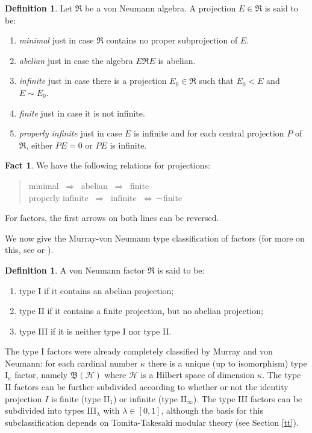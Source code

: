 \documentclass[11pt]{article}
\newcommand{\alg}[1]{\mathfrak{#1}}
\newcommand{\bh}{\mathfrak{B}(\mathcal{H})}
\theoremstyle{definition}
\newtheorem{fact}[thm]{Fact}
\theoremstyle{definition}
\newtheorem{defn}[thm]{Definition}
\theoremstyle{remark}
\def\2#1{{\mathcal #1}}
\def\al#1{{\mathfrak #1}}
\newcommand{\lra}{\:\Longrightarrow \:}
\begin{document}
\begin{defn} Let $\alg{R}$ be a von Neumann algebra.  A
  projection $E\in \alg{R}$ is said to be:
  \begin{enumerate}
  \item \emph{minimal} just in case $\alg{R}$ contains
    no proper subprojection of $E$.
  \item \emph{abelian} just in case the algebra $E\alg{R}E$ is abelian.
  \item \emph{infinite} just in case there is a
    projection $E_0\in \alg{R}$ such that $E_0<E$ and
    $E\sim E_0$.
  \item \emph{finite} just in case it is not infinite.
  \item \emph{properly infinite} just in case $E$ is infinite and for
    each central projection $P$ of $\al R$, either $PE=0$ or $PE$ is
    infinite.
  \end{enumerate}
\end{defn}

\begin{fact} We have the following relations for projections:
\begin{quote} \begin{center} minimal $\lra$ abelian $\lra$ finite  \\
    properly infinite $\lra$ infinite $\:\Longleftrightarrow \: \neg\,$finite
  \end{center} \end{quote} For factors, the first arrows on both lines can be
reversed.  \end{fact}

We now give the Murray-von Neumann type classification of factors (for
more on this, see \cite[Chap.\ 7]{kr} or \cite[Chap.\ 1]{sunder}).

\begin{defn} A von Neumann factor $\alg{R}$ is said to be: 
  \begin{enumerate}
  \item type I if it contains an abelian projection;
  \item type II if it contains a finite projection, but no abelian projection;
  \item type III if it is neither type I nor type II.
  \end{enumerate}
\end{defn}

The type I factors were already completely classified by Murray and
von Neumann: for each cardinal number $\kappa$ there is a unique (up
to isomorphism) type I$_\kappa$ factor, namely $\bh$ where $\2H$ is a
Hilbert space of dimension $\kappa$.  The type II factors can be
further subdivided according to whether or not the identity projection
$I$ is finite (type II$_1$) or infinite (type II$_{\infty}$).  The
type III factors can be subdivided into types III$_{\lambda}$ with
$\lambda \in [0,1]$, although the basis for this subclassification
depends on Tomita-Takesaki modular theory (see Section \ref{tt}).
\end{document}
